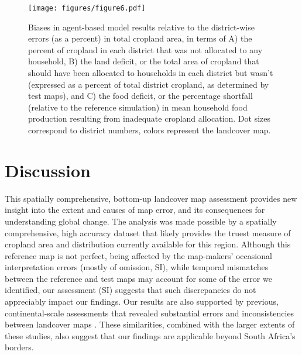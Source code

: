 \documentclass{pnastwo}
\begin{document}
\begin{article}

\begin{figure}[!ht]
\centerline{\texttt{[image: figures/figure6.pdf]}}
\caption{Biases in agent-based model results relative to the district-wise errors (as a percent) in total cropland area, in terms of A) the percent of cropland in each district that was not allocated to any household, B) the land deficit, or the total area of cropland that should have been allocated to households in each district but wasn't (expressed as a percent of total district cropland, as determined by test maps), and C) the food deficit, or the percentage shortfall (relative to the reference simulation) in mean household food production resulting from inadequate cropland allocation. Dot sizes correspond to district numbers, colors represent the landcover map.}
\label{afoto}
\end{figure}

\section{Discussion}
This spatially comprehensive, bottom-up landcover map assessment provides new insight into the extent and causes of map error, and its consequences for understanding global change. The analysis was made possible by a spatially comprehensive, high accuracy dataset that likely provides the truest measure of cropland area and distribution currently available for this region. Although this reference map is not perfect, being affected by the map-makers' occasional interpretation errors (mostly of omission, SI), while temporal mismatches between the reference and test maps may account for some of the error we identified, our assessment (SI) suggests that such discrepancies do not appreciably impact our findings. Our results are also supported by previous, continental-scale assessments that revealed substantial errors and inconsistencies between landcover maps \cite{fritz_comparison_2010,gross_monitoring_2013}. These similarities, combined with the larger extents of these studies, also suggest that our findings are applicable beyond South Africa's borders.


\end{article}
\end{document}

